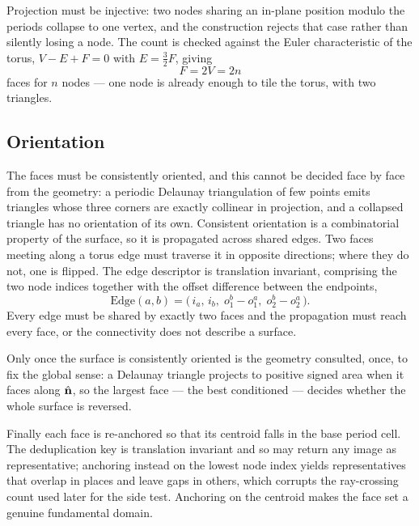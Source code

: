 Projection must be injective: two nodes sharing an in-plane position modulo the
periods collapse to one vertex, and the construction rejects that case rather
than silently losing a node. The count is checked against the Euler
characteristic of the torus, $V - E + F = 0$ with $E = \tfrac{3}{2}F$, giving
\begin{equation}
  F = 2V = 2n
  \label{eq:euler}
\end{equation}
faces for $n$ nodes --- one node is already enough to tile the torus, with two
triangles.

\subsection*{Orientation}

The faces must be consistently oriented, and this cannot be decided face by face
from the geometry: a periodic Delaunay triangulation of few points emits
triangles whose three corners are exactly collinear in projection, and a
collapsed triangle has no orientation of its own. Consistent orientation is a
combinatorial property of the surface, so it is propagated across shared edges.
Two faces meeting along a torus edge must traverse it in opposite directions;
where they do not, one is flipped. The edge descriptor is translation
invariant, comprising the two node indices together with the offset difference
between the endpoints,
\begin{equation}
  \text{Edge}(a,b) = \bigl(\, i_a,\, i_b,\; o_1^{b}-o_1^{a},\; o_2^{b}-o_2^{a} \,\bigr).
  \label{eq:edgekey}
\end{equation}
Every edge must be shared by exactly two faces and the propagation must reach
every face, or the connectivity does not describe a surface.

Only once the surface is consistently oriented is the geometry consulted, once,
to fix the global sense: a Delaunay triangle projects to positive signed area
when it faces along $\hat{\mathbf{n}}$, so the largest face --- the best conditioned ---
decides whether the whole surface is reversed.

Finally each face is re-anchored so that its centroid falls in the base period
cell. The deduplication key is translation invariant and so may return any
image as representative; anchoring instead on the lowest node index yields
representatives that overlap in places and leave gaps in others, which corrupts
the ray-crossing count used later for the side test. Anchoring on the centroid
makes the face set a genuine fundamental domain.


